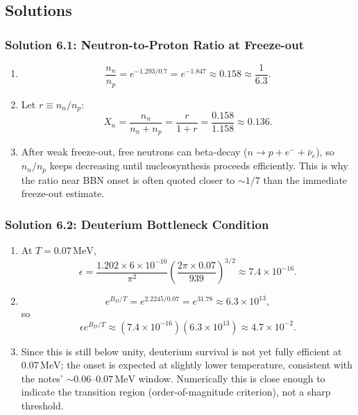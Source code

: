 \bigskip
\bigskip
\bigskip

\subsection{Solutions}

\subsubsection*{Solution 6.1: Neutron-to-Proton Ratio at Freeze-out}

\begin{enumerate}[label=(\alph*)]
  \item
  \[
    \frac{n_n}{n_p}=e^{-1.293/0.7}=e^{-1.847}\approx 0.158\approx \frac{1}{6.3}.
  \]

  \item Let $r\equiv n_n/n_p$:
  \[
    X_n = \frac{n_n}{n_n+n_p} = \frac{r}{1+r}
    = \frac{0.158}{1.158} \approx 0.136.
  \]

  \item After weak freeze-out, free neutrons can beta-decay ($n\to p+e^-+\bar\nu_e$), so $n_n/n_p$ keeps decreasing until nucleosynthesis proceeds efficiently.
  This is why the ratio near BBN onset is often quoted closer to $\sim 1/7$ than the immediate freeze-out estimate.
\end{enumerate}

\subsubsection*{Solution 6.2: Deuterium Bottleneck Condition}

\begin{enumerate}[label=(\alph*)]
  \item At $T=0.07\,\mathrm{MeV}$,
  \[
    \epsilon = \frac{1.202\times 6\times10^{-10}}{\pi^2}
    \left(\frac{2\pi\times0.07}{939}\right)^{3/2}
    \approx 7.4\times10^{-16}.
  \]

  \item
  \[
    e^{B_D/T}=e^{2.2245/0.07}=e^{31.78}\approx 6.3\times10^{13},
  \]
  so
  \[
    \epsilon e^{B_D/T}\approx (7.4\times10^{-16})(6.3\times10^{13})\approx 4.7\times10^{-2}.
  \]

  \item Since this is still below unity, deuterium survival is not yet fully efficient at $0.07\,\mathrm{MeV}$; the onset is expected at slightly lower temperature, consistent with the notes' $\sim 0.06$--$0.07\,\mathrm{MeV}$ window.
  Numerically this is close enough to indicate the transition region (order-of-magnitude criterion), not a sharp threshold.
\end{enumerate}

